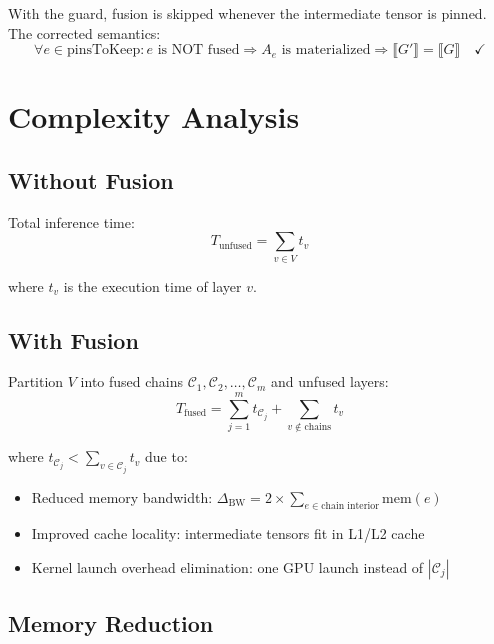 \documentclass[12pt]{article}
\theoremstyle{definition}
\begin{document}
With the guard, fusion is skipped whenever the intermediate tensor is pinned. The corrected semantics:
\begin{equation}
\forall e \in \text{pinsToKeep}: e \text{ is NOT fused} \Rightarrow A_e \text{ is materialized} \Rightarrow \llbracket G' \rrbracket = \llbracket G \rrbracket \quad \checkmark
\end{equation}

\section{Complexity Analysis}

\subsection{Without Fusion}

Total inference time:
\begin{equation}
T_{\text{unfused}} = \sum_{v \in V} t_v
\end{equation}

where $t_v$ is the execution time of layer $v$.

\subsection{With Fusion}

Partition $V$ into fused chains $\mathcal{C}_1, \mathcal{C}_2, \ldots, \mathcal{C}_m$ and unfused layers:
\begin{equation}
T_{\text{fused}} = \sum_{j=1}^{m} t_{\mathcal{C}_j} + \sum_{v \notin \text{chains}} t_v
\end{equation}

where $t_{\mathcal{C}_j} < \sum_{v \in \mathcal{C}_j} t_v$ due to:
\begin{itemize}
  \item Reduced memory bandwidth: $\Delta_{\text{BW}} = 2 \times \sum_{e \in \text{chain interior}} \text{mem}(e)$
  \item Improved cache locality: intermediate tensors fit in L1/L2 cache
  \item Kernel launch overhead elimination: one GPU launch instead of $|\mathcal{C}_j|$
\end{itemize}

\subsection{Memory Reduction}
\end{document}
